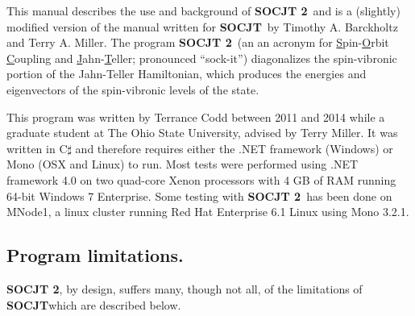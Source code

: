 \documentclass{article}
\newcommand{\ul}{\underline }
\newcommand{\socjttwo}{{\bf SOCJT 2}}
\newcommand{\socjt}{{\bf SOCJT}}
\newcommand{\socrt}{{\bf SOCRT}}
\begin{document}
This manual describes the use and background of \socjttwo\ and is a (slightly) modified version of the manual written for \socjt\ by Timothy A. Barckholtz and Terry A. Miller.
The program \socjttwo\ (an an acronym for {\ul S}pin-{\ul O}rbit {\ul C}oupling
and {\ul J}ahn-{\ul T}eller; pronounced ``sock-it'') diagonalizes the
spin-vibronic portion of the Jahn-Teller Hamiltonian, which produces
the energies and eigenvectors of the spin-vibronic levels of the
state.

\begin{comment}
Besides diagonalizing the spin-vibronic Hamiltonian, the programs
\socjt\ and \socrt\ calculate several properties of the system. All of
these properties are detailed later in section \ref{section:output}.
One of the most important items calculated by \socjt\ is the relative
intensities of the vibronic transitions involved in an electronic
transition to and from the degenerate state. These calculations assume
diagonal Franck-Condon factors, and only the intensities of
progressions of the Jahn-Teller active modes are computed. In the main
\socjt\ and \socrt\ programs, it is assumed that the non-Jahn-Teller
active state involved in the electronic transition is a singly
degenerate or non-Jahn-Teller active degenerate state.
\end{comment}

This program was written by Terrance Codd between 2011 and 2014 while
a graduate student at The Ohio State University, advised by Terry
Miller. It was written in C$\sharp$ and therefore requires either the .NET framework (Windows) or Mono (OSX and Linux) to run.  Most tests were performed using .NET framework 4.0 on two quad-core Xenon processors with 4 GB of RAM running 64-bit Windows 7 Enterprise.  Some testing with \socjttwo\ has been done on MNode1, a linux cluster running Red Hat Enterprise 6.1 Linux using Mono 3.2.1.
\begin{comment}
A version for the Cray
operating system is available upon request, as is the source code for
the DOS versions. This program should be cited as: Barckholtz, T. A.;
Miller, T. A.  {\it Int. Rev. Phys. Chem.}, {\bf 1998}, {\it 17},
435-524.
\end{comment}

\subsection{Program limitations.} \label{section:limitations}
\socjttwo, by design, suffers many, though not all, of the limitations of \socjt which are described below.
\end{document}
